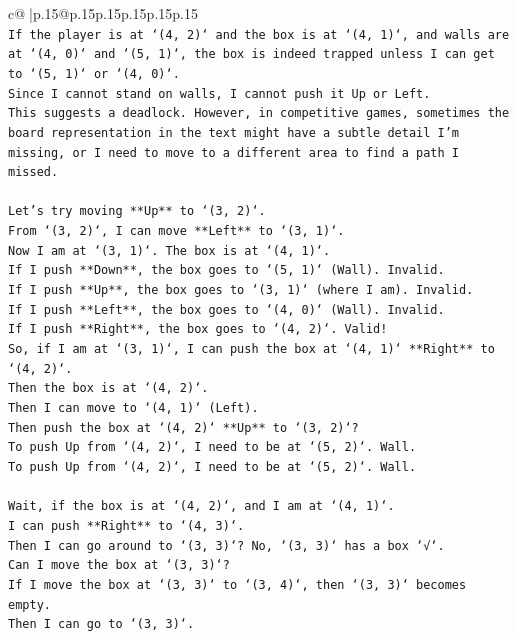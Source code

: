 \documentclass{article}
\begin{document}
{\begin{supertabular}{c@{$\;$}|p{.15\linewidth}@{}p{.15\linewidth}p{.15\linewidth}p{.15\linewidth}p{.15\linewidth}p{.15\linewidth}}
{{{\\ 
\texttt{If the player is at `(4, 2)` and the box is at `(4, 1)`, and walls are at `(4, 0)` and `(5, 1)`, the box is indeed trapped unless I can get to `(5, 1)` or `(4, 0)`.} \\
\texttt{Since I cannot stand on walls, I cannot push it Up or Left.} \\
\texttt{This suggests a deadlock. However, in competitive games, sometimes the board representation in the text might have a subtle detail I'm missing, or I need to move to a different area to find a path I missed.} \\
\\ 
\texttt{Let's try moving **Up** to `(3, 2)`.} \\
\texttt{From `(3, 2)`, I can move **Left** to `(3, 1)`.} \\
\texttt{Now I am at `(3, 1)`. The box is at `(4, 1)`.} \\
\texttt{If I push **Down**, the box goes to `(5, 1)` (Wall). Invalid.} \\
\texttt{If I push **Up**, the box goes to `(3, 1)` (where I am). Invalid.} \\
\texttt{If I push **Left**, the box goes to `(4, 0)` (Wall). Invalid.} \\
\texttt{If I push **Right**, the box goes to `(4, 2)`. Valid!} \\
\texttt{So, if I am at `(3, 1)`, I can push the box at `(4, 1)` **Right** to `(4, 2)`.} \\
\texttt{Then the box is at `(4, 2)`.} \\
\texttt{Then I can move to `(4, 1)` (Left).} \\
\texttt{Then push the box at `(4, 2)` **Up** to `(3, 2)`?} \\
\texttt{To push Up from `(4, 2)`, I need to be at `(5, 2)`. Wall.} \\
\texttt{To push Up from `(4, 2)`, I need to be at `(5, 2)`. Wall.} \\
\\ 
\texttt{Wait, if the box is at `(4, 2)`, and I am at `(4, 1)`.} \\
\texttt{I can push **Right** to `(4, 3)`.} \\
\texttt{Then I can go around to `(3, 3)`? No, `(3, 3)` has a box `√`.} \\
\texttt{Can I move the box at `(3, 3)`?} \\
\texttt{If I move the box at `(3, 3)` to `(3, 4)`, then `(3, 3)` becomes empty.} \\
\texttt{Then I can go to `(3, 3)`.} \\
}}}
\end{supertabular}}
\end{document}

